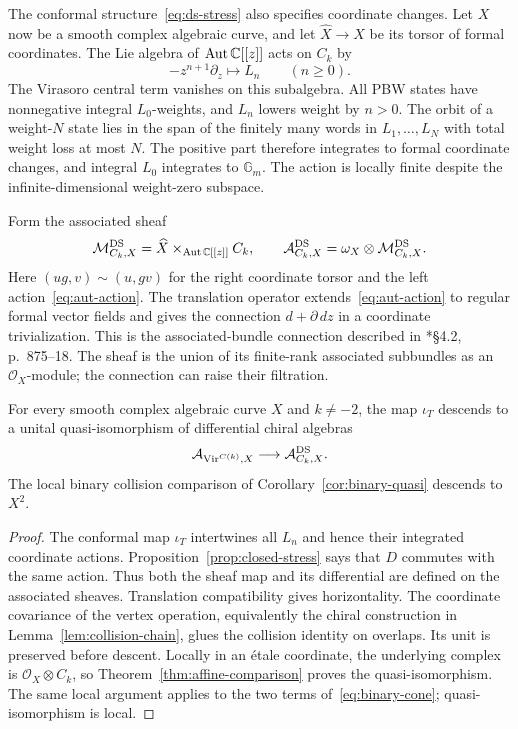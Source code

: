 The conformal structure~\eqref{eq:ds-stress} also specifies coordinate changes.
Let $X$ now be a smooth complex algebraic curve, and let $\widehat X\to X$ be its torsor of formal coordinates.
The Lie algebra of $\operatorname{Aut}\mathbb C[[z]]$ acts on $C_k$ by
\begin{equation}\label{eq:aut-action}
 -z^{n+1}\partial_z\longmapsto L_n\qquad(n\geq0).
\end{equation}
The Virasoro central term vanishes on this subalgebra.
All PBW states have nonnegative integral $L_0$-weights, and $L_n$ lowers weight by $n>0$.
The orbit of a weight-$N$ state lies in the span of the finitely many words in $L_1,\ldots,L_N$ with total weight loss at most $N$.
The positive part therefore integrates to formal coordinate changes, and integral $L_0$ integrates to $\mathbb G_m$.
The action is locally finite despite the infinite-dimensional weight-zero subspace.

Form the associated sheaf
\[
 \mathcal M^{\mathrm{DS}}_{C_k,X}
     =\widehat X\mathbin{\times}_{\operatorname{Aut}\mathbb C[[z]]}C_k,
 \qquad
 \mathcal A^{\mathrm{DS}}_{C_k,X}
     =\omega_X\otimes\mathcal M^{\mathrm{DS}}_{C_k,X}.
\]
Here $(u g,v)\sim(u,g v)$ for the right coordinate torsor and the left action~\eqref{eq:aut-action}.
The translation operator extends~\eqref{eq:aut-action} to regular formal vector fields and gives the connection $d+\partial\,dz$ in a coordinate trivialization.
This is the associated-bundle connection described in \cite{AffineDSFrenkel026}*{\S4.2, p.~875--18}.
The sheaf is the union of its finite-rank associated subbundles as an $\mathcal O_X$-module; the connection can raise their filtration.

\begin{proposition}\label{prop:global-descent}
For every smooth complex algebraic curve $X$ and $k\neq-2$, the map $\iota_T$ descends to a unital quasi-isomorphism of differential chiral algebras
\[
 \mathcal A_{\operatorname{Vir}^{C(k)},X}
       \longrightarrow\mathcal A^{\mathrm{DS}}_{C_k,X}.
\]
The local binary collision comparison of Corollary~\ref{cor:binary-quasi} descends to $X^2$.
\end{proposition}
\begin{proof}
The conformal map $\iota_T$ intertwines all $L_n$ and hence their integrated coordinate actions.
Proposition~\ref{prop:closed-stress} says that $D$ commutes with the same action.
Thus both the sheaf map and its differential are defined on the associated sheaves.
Translation compatibility gives horizontality.
The coordinate covariance of the vertex operation, equivalently the chiral construction in Lemma~\ref{lem:collision-chain}, glues the collision identity on overlaps.
Its unit is preserved before descent.
Locally in an \'etale coordinate, the underlying complex is $\mathcal O_X\otimes C_k$, so Theorem~\ref{thm:affine-comparison} proves the quasi-isomorphism.
The same local argument applies to the two terms of~\eqref{eq:binary-cone}; quasi-isomorphism is local.
\end{proof}

